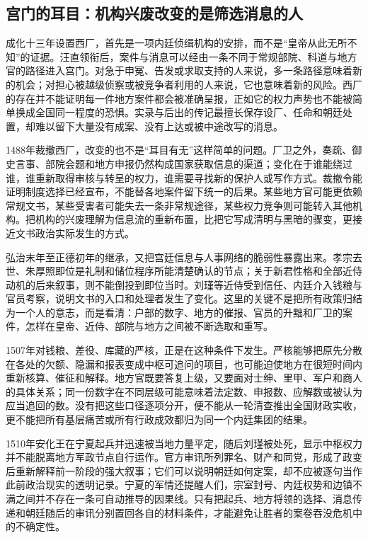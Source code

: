 \subsection{宫门的耳目：机构兴废改变的是筛选消息的人}

成化十三年设置西厂，首先是一项内廷侦缉机构的安排，而不是“皇帝从此无所不知”的证据。汪直领衔后，案件与消息可以经由一条不同于常规部院、科道与地方官的路径进入宫门。对急于申冤、告发或求取支持的人来说，多一条路径意味着新的机会；对担心被越级侦察或被竞争者利用的人来说，它也意味着新的风险。西厂的存在并不能证明每一件地方案件都会被准确呈报，正如它的权力声势也不能被简单换成全国同一程度的恐惧。实录与后出的传记最擅长保存设厂、任命和朝廷处置，却难以留下大量没有成案、没有上达或被中途改写的消息。

1488年裁撤西厂，改变的也不是“耳目有无”这样简单的问题。厂卫之外，奏疏、御史言事、部院会题和地方申报仍然构成国家获取信息的渠道；变化在于谁能绕过谁，谁重新取得审核与转呈的权力，谁需要寻找新的保护人或写作方式。裁撤令能证明制度选择已经宣布，不能替各地案件留下统一的后果。某些地方官可能更依赖常规文书，某些受害者可能失去一条非常规途径，某些权力竞争则可能转入其他机构。把机构的兴废理解为信息流的重新布置，比把它写成清明与黑暗的骤变，更接近文书政治实际发生的方式。

弘治末年至正德初年的继承，又把宫廷信息与人事网络的脆弱性暴露出来。孝宗去世、朱厚照即位是礼制和储位程序所能清楚确认的节点；关于新君性格和全部近侍动机的后来叙事，则不能倒投到即位当时。刘瑾等近侍受到信任、内廷介入钱粮与官员考察，说明文书的入口和处理者发生了变化。这里的关键不是把所有政策归结为一个人的意志，而是看清：户部的数字、地方的催报、官员的升黜和厂卫的案件，怎样在皇帝、近侍、部院与地方之间被不断选取和重写。

1507年对钱粮、差役、库藏的严核，正是在这种条件下发生。严核能够把原先分散在各处的欠额、隐漏和报表变成中枢可追问的项目，也可能迫使地方在很短时间内重新核算、催征和解释。地方官既要答复上级，又要面对士绅、里甲、军户和商人的具体关系；同一份数字在不同层级可能意味着法定数、申报数、应解数或被认为应当追回的数。没有把这些口径逐项分开，便不能从一轮清查推出全国财政实收，更不能把所有基层痛苦或所有行政成效都归为同一个内廷集团的结果。

1510年安化王在宁夏起兵并迅速被当地力量平定，随后刘瑾被处死，显示中枢权力并不能脱离地方军政节点自行运作。官方审讯所列罪名、财产和同党，形成了政变后重新解释前一阶段的强大叙事；它们可以说明朝廷如何定案，却不应被逐句当作此前政治现实的透明记录。宁夏的军情还提醒人们，宗室封号、内廷权势和边镇不满之间并不存在一条可自动推导的因果线。只有把起兵、地方将领的选择、消息传递和朝廷随后的审讯分别置回各自的材料条件，才能避免让胜者的案卷吞没危机中的不确定性。

